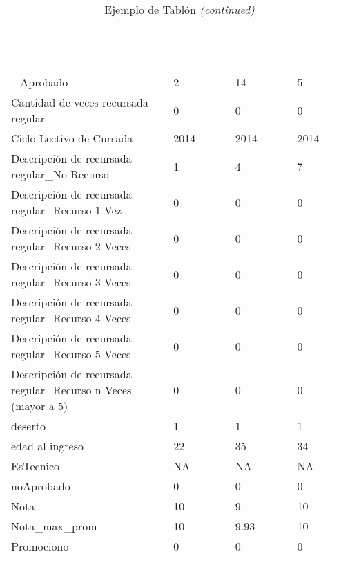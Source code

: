 \begingroup\fontsize{10}{12}\selectfont

\begin{longtable}[t]{llll}
\caption{\label{tab:tabla_tablon_baseline}Ejemplo de Tablón}\\
\toprule
\rowcolor{black}  \multicolumn{1}{c}{\textcolor{white}{\textbf{variable}}} & \multicolumn{1}{c}{\textcolor{white}{\textbf{10000007}}} & \multicolumn{1}{c}{\textcolor{white}{\textbf{10000015}}} & \multicolumn{1}{c}{\textcolor{white}{\textbf{10000016}}}\\
\midrule
\endfirsthead
\caption[]{Ejemplo de Tablón \textit{(continued)}}\\
\toprule
\rowcolor{black}  \multicolumn{1}{c}{\textcolor{white}{\textbf{variable}}} & \multicolumn{1}{c}{\textcolor{white}{\textbf{10000007}}} & \multicolumn{1}{c}{\textcolor{white}{\textbf{10000015}}} & \multicolumn{1}{c}{\textcolor{white}{\textbf{10000016}}}\\
\midrule
\endhead
\
\endfoot
\bottomrule
\endlastfoot
\rowcolor{gray!6}  Aprobado & 2 & 14 & 5\\
Cantidad de veces recursada regular & 0 & 0 & 0\\
\rowcolor{gray!6}  Ciclo Lectivo de Cursada & 2014 & 2014 & 2014\\
Descripción de recursada regular\_No Recurso & 1 & 4 & 7\\
\rowcolor{gray!6}  Descripción de recursada regular\_Recurso 1 Vez & 0 & 0 & 0\\
\addlinespace
Descripción de recursada regular\_Recurso 2 Veces & 0 & 0 & 0\\
\rowcolor{gray!6}  Descripción de recursada regular\_Recurso 3 Veces & 0 & 0 & 0\\
Descripción de recursada regular\_Recurso 4 Veces & 0 & 0 & 0\\
\rowcolor{gray!6}  Descripción de recursada regular\_Recurso 5 Veces & 0 & 0 & 0\\
Descripción de recursada regular\_Recurso n Veces (mayor a 5) & 0 & 0 & 0\\
\addlinespace
\rowcolor{gray!6}  deserto & 1 & 1 & 1\\
edad al ingreso & 22 & 35 & 34\\
\rowcolor{gray!6}  EsTecnico & NA & NA & NA\\
noAprobado & 0 & 0 & 0\\
\rowcolor{gray!6}  Nota & 10 & 9 & 10\\
\addlinespace
Nota\_max\_prom & 10 & 9.93 & 10\\
\rowcolor{gray!6}  Promociono & 0 & 0 & 0\\

\end{longtable}
